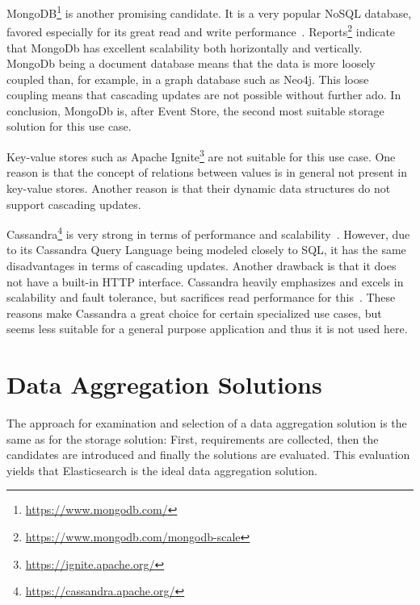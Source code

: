 MongoDB\footnote{\url{https://www.mongodb.com/}} is another promising candidate.
It is a very popular NoSQL database, favored especially for its great read and write performance~\cite{6625441}.
Reports\footnote{\url{https://www.mongodb.com/mongodb-scale}} indicate that MongoDb has excellent scalability both horizontally and vertically.
MongoDb being a document database means that the data is more loosely coupled than, for example, in a graph database such as Neo4j.
This loose coupling means that cascading updates are not possible without further ado.
In conclusion, MongoDb is, after Event Store, the second most suitable storage solution for this use case.

Key-value stores such as Apache Ignite\footnote{\url{https://ignite.apache.org/}} are not suitable for this use case.
One reason is that the concept of relations between values is in general not present in key-value stores.
Another reason is that their dynamic data structures do not support cascading updates.

Cassandra\footnote{\url{https://cassandra.apache.org/}} is very strong in terms of performance and scalability~\cite{lakshman2009cassandra}.
However, due to its Cassandra Query Language being modeled closely to \ac{SQL}, it has the same disadvantages in terms of cascading updates.
Another drawback is that it does not have a built-in HTTP interface.
Cassandra heavily emphasizes and excels in scalability and fault tolerance, but sacrifices read performance for this~\cite{6625441}.
These reasons make Cassandra a great choice for certain specialized use cases, but seems less suitable for a general purpose application and thus it is not used here.

\section{Data Aggregation Solutions}
\label{sec:classifications:aggregation}

The approach for examination and selection of a data aggregation solution is the same as for the storage solution:
First, requirements are collected, then the candidates are introduced and finally the solutions are evaluated.
This evaluation yields that Elasticsearch is the ideal data aggregation solution.


